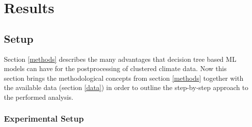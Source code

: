 \documentclass[ba-lentz.tex]{subfile}
\begin{document}
{\let\clearpage\relax \chapter{Results}\label{results}}


\section{Setup}\label{setup}

Section \ref{methods} describes the many advantages that decision tree based ML models can have for the postprocessing of clustered climate data.
Now this section brings the methodological concepts from section \ref{methods} together with the available data (section \ref{data}) in order to outline the step-by-step approach to the performed analysis. \\

\subsection{Experimental Setup}
\end{document}
